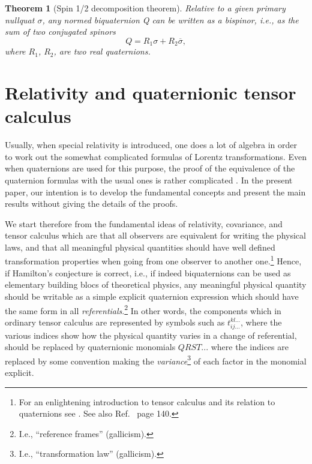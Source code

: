 \documentclass [12pt,a4paper      ]{article}
\newtheorem{theorem}{Theorem}
\newcommand{\CON}{\overline}          %
\begin{document}
%
\begin{theorem}[Spin 1/2 decomposition theorem]
\label{theo:6}
%
     Relative to  a  given primary nullquat $\sigma$, any normed 
     biquaternion Q can be written as a \emph{bispinor}, i.e., as the 
     sum of two conjugated \emph{spinors} 
%
\begin{equation}\label{E15}
           Q =   R_1 \sigma + R_2 \CON{\sigma},            %
\end{equation}
%
     where $R_1$, $R_2$, are two real quaternions.
%
\end{theorem}
%



\section{Relativity and quaternionic tensor calculus}
\label{rel:0}

     Usually,  when special relativity is introduced,  one does a 
lot  of  algebra  in order to work out the  somewhat  complicated 
formulas of Lorentz transformations.   Even when quaternions  are 
used  for  this  purpose,  the proof of the  equivalence  of  the 
quaternion  formulas  with the usual ones is rather  complicated 
\cite{R10}.   In  the present paper,  our intention is to develop   the 
fundamental concepts and present the main results without giving 
the details of the proofs.

     We start therefore from the fundamental ideas of relativity, 
covariance, and tensor calculus which are that all observers are 
equivalent for writing the physical laws, and that all meaningful physical 
quantities  should  have well defined  transformation  properties 
when  going  from  one  observer  to  another  one.\footnote{For an enlightening introduction to tensor calculus and its relation to quaternions see \cite{R11}. See also Ref.~\cite{R2} page 140.}   Hence,  if 
Hamilton's  conjecture is correct,  i.e.,  if indeed biquaternions 
can be used as  elementary building blocs of theoretical physics, 
any meaningful physical quantity should be writable as a  simple 
explicit quaternion expression which should have the same form in all 
{\it referentials}.\footnote{I.e., ``reference frames'' (gallicism).}  In  other words,  the components which  in  ordinary 
tensor calculus are represented by symbols such as $t_{ij...}^{kl...}$, where 
the  various  indices show how the physical quantity varies in  a 
change  of  referential,   should  be  replaced  by  quaternionic 
monomials $QRST...$ where the indices are replaced by some 
convention making the {\it variance}\footnote{I.e., ``transformation law'' (gallicism).} of each factor in the monomial explicit.
\end{document}
